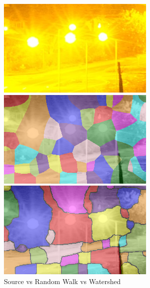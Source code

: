 \documentclass[11pt,twocolumn]{article} %
\begin{document}
\begin{figure}
  \begin{multicols}{3}
    \includegraphics[width=\columnwidth]{./images/comparison/source.png}

    \includegraphics[width=\columnwidth]{./images/comparison/random.png}

    \includegraphics[width=\columnwidth]{./images/comparison/watershed.png}
  \end{multicols}
        \caption{Source vs Random Walk vs Watershed}
        \label{fig:random}
\end{figure}
\end{document}
